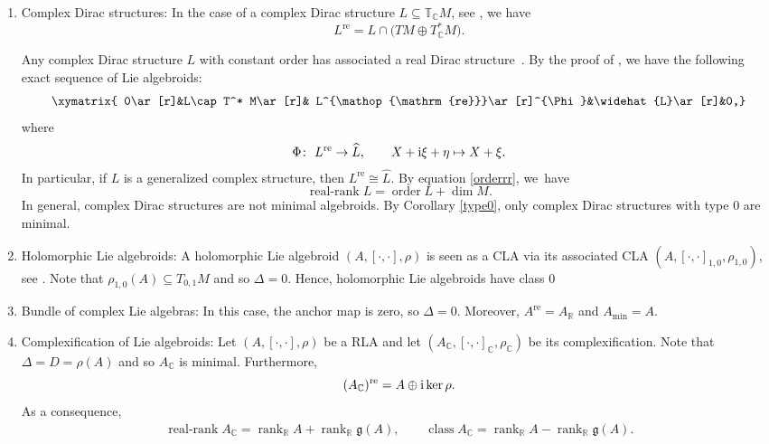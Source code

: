 \documentclass[pdftex]{sigma}
\numberwithin{equation}{section}
\newcommand{\R}{{\mathbb{R}}}
\newcommand{\C}{{\mathbb{C}}}
\newcommand{\g}{\mathfrak{g}}
\newcommand{\T}{\mathbb{T}}
\DeclareMathOperator{\order}{order}
\DeclareMathOperator{\rk}{rank}
\DeclareMathOperator{\real}{re}
\DeclareMathOperator{\rerk}{real-rank}
\DeclareMathOperator{\class}{class}
\begin{document}
 \begin{Examples}\label{examples1-2-6}\quad
 \begin{enumerate}\itemsep=0pt
\item Complex Dirac structures:
In the case of a complex Dirac structure $L\subseteq \T_{\C}M$, see \cite{aguero2022complex}, we have
 \[L^{\real}=L\cap \bigl(TM\oplus T^*_{\C}M\bigr).\]

Any complex Dirac structure $L$ with constant order has associated a real Dirac structure~. By the proof of \cite[Theorem 5.1]{aguero2022complex}, we have the following exact sequence of Lie algebroids:
\[
\xymatrix{
0\ar[r]&L\cap T^* M\ar[r]& L^{\real}\ar[r]^{\Phi}&\widehat{L}\ar[r]&0,}
\]
where
\begin{align*}
\Phi\colon\ L^{\real}\to \widehat{L},\qquad
X+{\rm i}\xi+\eta\mapsto X+\xi.
\end{align*}
In particular, if $L$ is a generalized complex structure, then $L^{\real}\cong \hat{L}$. By equation \eqref{orderrr}, we~have
\[\rerk L=\order L+\dim M.\]
In general, complex Dirac structures are not minimal algebroids. By Corollary \ref{type0}, only complex Dirac structures with type $0$ are minimal.
\item Holomorphic Lie algebroids: A holomorphic Lie algebroid $(A,[\cdot,\cdot], \rho)$ is seen as a CLA via its associated CLA $(A, [\cdot,\cdot]_{1,0},\rho_{1,0})$, see \cite{laurent2008holomorphic}. Note that $\rho_{1,0}(A)\subseteq T_{0,1}M$ and so $\Delta=0$. Hence, holomorphic Lie algebroids have class $0$%
\item Bundle of complex Lie algebras: In this case, the anchor map is zero, so $\Delta=0$. Moreover, $A^{\real}= A_{\R}$ and $A_{\min}=A$.
\item Complexification of Lie algebroids: Let $(A, [\cdot, \cdot], \rho)$ be a RLA and let $(A_{\C}, [\cdot, \cdot]_{\C}, \rho_{\C})$ be its complexification.
Note that $\Delta=D=\rho(A)$ and so $A_{\C}$ is minimal. Furthermore,
\[(A_{\C})^{\real}=A\oplus {\rm i}\ker \rho.\]
As a consequence, \begin{align*}
 \rerk A_{\C}=\rk_{\R} A+\rk_{\R}\g(A),\qquad
  \class A_{\C}=\rk_{\R} A-\rk_{\R}\g(A).
\end{align*}


\end{enumerate}
\end{Examples}
\end{document}
